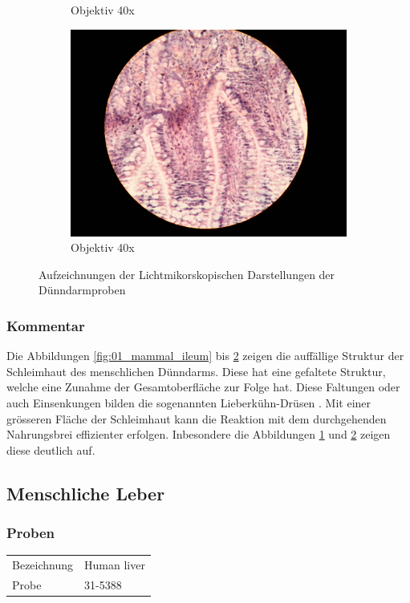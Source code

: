 \begin{figure}[h!]
\begin{subfigure}[b]{0.3\textwidth}
		\caption{Objektiv 40x}
		\label{fig:05_mammal_ileum}
	\end{subfigure}
	\begin{subfigure}[b]{0.3\textwidth}
		\includegraphics[angle=270, width=1\textwidth]{../images/06_mammal_illeum.jpg}
		\caption{Objektiv 40x}
		\label{fig:06_mammal_ileum}
	\end{subfigure}
	\caption{Aufzeichnungen der Lichtmikorskopischen Darstellungen der
		Dünndarmproben}
	\label{fig:mammal_ileum}
\end{figure}

\subsubsection{Kommentar}
Die Abbildungen \ref{fig:01_mammal_ileum} bis \ref{fig:06_mammal_ileum}
zeigen die auffällige Struktur der Schleimhaut des menschlichen Dünndarms.
Diese hat eine gefaltete Struktur, welche eine Zunahme der Gesamtoberfläche
zur Folge hat. Diese Faltungen oder auch Einsenkungen bilden die sogenannten
Lieberkühn-Drüsen \cite{wiki-leberkuehn-krypten}. Mit einer grösseren Fläche
der Schleimhaut kann die Reaktion mit dem durchgehenden Nahrungsbrei
effizienter erfolgen. Inbesondere die Abbildungen \ref{fig:05_mammal_ileum}
und \ref{fig:06_mammal_ileum} zeigen diese deutlich auf.

\newpage
\subsection{Menschliche Leber}

\subsubsection{Proben}
\begin{table}[h!]
	\centering
	\begin{tabular}{l l}
		Bezeichnung	& Human liver \\
		Probe 		& 31-5388
	\end{tabular}
\end{table}

